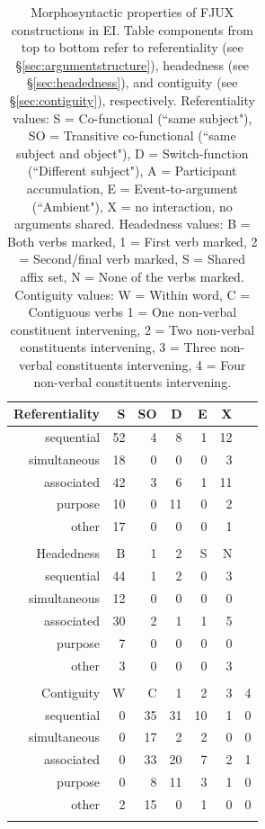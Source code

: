 \begin{table}
\centering
\begin{tabular}{rrrrrrr}
  \lsptoprule
Referentiality & S & SO & D & E & X \\ 
  \midrule
  sequential &  52 &   4 &   8 &   1 &  12 \\ 
  simultaneous &  18 &   0 &   0 &   0 &   3 \\ 
  associated &  42 &   3 &   6 &   1 &  11 \\ 
  purpose &  10 &   0 &  11 &   0 &   2 \\ 
  other &  17 &   0 &   0 &   0 &   1 \\ 
   \midrule
 \\
  \midrule
Headedness & B & 1 & 2 & S & N \\ 
  \midrule
  sequential &  44 &   1 &   2 &   0 &   3 \\ 
  simultaneous &  12 &   0 &   0 &   0 &   0 \\ 
  associated &  30 &   2 &   1 &   1 &   5 \\ 
  purpose &   7 &   0 &   0 &   0 &   0 \\ 
  other &   3 &   0 &   0 &   0 &   3 \\ 
   \midrule
 \\
  \midrule
Contiguity & W & C & 1 & 2 & 3 & 4 \\ 
  \midrule
  sequential &   0 &  35 &  31 &  10 &   1 &   0 \\ 
  simultaneous &   0 &  17 &   2 &   2 &   0 &   0 \\ 
  associated &   0 &  33 &  20 &   7 &   2 &   1 \\ 
  purpose &   0 &   8 &  11 &   3 &   1 &   0 \\ 
  other &   2 &  15 &   0 &   1 &   0 &   0 \\ 
   \lspbottomrule
\end{tabular}
\caption[Morphosyntactic properties of FJUX constructions]{Morphosyntactic properties of FJUX constructions in EI. Table components from top to bottom refer to referentiality (see §\ref{sec:argumentstructure}), headedness (see §\ref{sec:headedness}), and contiguity (see §\ref{sec:contiguity}), respectively. Referentiality values: S = Co-functional (``same subject"), SO = Transitive co-functional (``same subject and object"), D = Switch-function (``Different subject"), A = Participant accumulation, E = Event-to-argument (``Ambient"), X = no interaction, no arguments shared. Headedness values: B = Both verbs marked, 1 = First verb marked, 2 = Second/final verb marked, S = Shared affix set, N = None of the verbs marked. Contiguity values: W = Within word, C = Contiguous verbs 1 = One non-verbal constituent intervening, 2 = Two non-verbal constituents intervening, 3 = Three non-verbal constituents intervening, 4 = Four non-verbal constituents intervening.}
\label{table:FJUX_formal}
\end{table}

